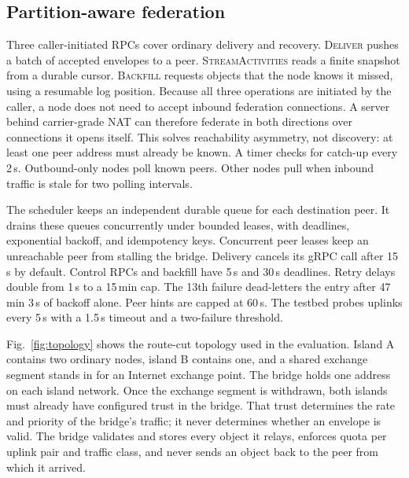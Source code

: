 \documentclass[conference,a4paper,10pt]{IEEEtran}
\begin{document}
\subsection{Partition-aware federation}

Three caller-initiated RPCs cover ordinary delivery and recovery.
\textsc{Deliver} pushes a batch of accepted envelopes to a peer.
\textsc{StreamActivities} reads a finite snapshot from a durable cursor.
\textsc{Backfill} requests objects that the node knows it missed, using a
resumable log position. Because all three operations are initiated by the
caller, a node does not need to accept inbound federation connections. A
server behind carrier-grade NAT can therefore federate in both directions
over connections it opens itself. This solves reachability asymmetry, not
discovery: at least one peer address must already be known. A timer checks for catch-up every 2\,s. Outbound-only nodes poll known peers. Other nodes pull when inbound traffic is stale for two polling intervals.

The scheduler keeps an independent durable queue for each destination peer.
It drains these queues concurrently under bounded leases, with deadlines,
exponential backoff, and idempotency keys. Concurrent peer leases keep an unreachable peer from stalling the bridge. Delivery cancels its gRPC call after 15\,s by default. Control RPCs and backfill have 5\,s and 30\,s deadlines. Retry delays double from 1\,s to a 15\,min cap. The 13th failure dead-letters the entry after 47\,min 3\,s of backoff alone. Peer hints are capped at 60\,s. The testbed probes uplinks every 5\,s with a 1.5\,s timeout and a two-failure threshold.

Fig.~\ref{fig:topology} shows the route-cut topology used in the evaluation.
Island A contains two ordinary nodes, island B contains one, and a shared
exchange segment stands in for an Internet exchange point. The bridge holds
one address on each island network. Once the exchange segment is withdrawn,
both islands must already have configured trust in the bridge. That trust
determines the rate and priority of the bridge's traffic; it never determines
whether an envelope is valid. The bridge validates and stores every object it
relays, enforces quota per uplink pair and traffic class, and never sends an
object back to the peer from which it arrived.
\end{document}
